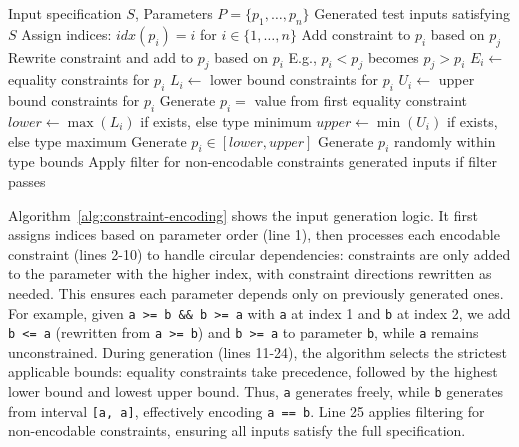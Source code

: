 \begin{algorithm}[t]
\caption{Constraint-Aware Input Generation (\VariantImproved{})}
\label{alg:constraint-encoding}
\begin{algorithmic}[1]
\REQUIRE Input specification $S$, Parameters $P = \{p_1, \ldots, p_n\}$
\ENSURE Generated test inputs satisfying $S$
\STATE Assign indices: $idx(p_i) = i$ for $i \in \{1, \ldots, n\}$
        \STATE Add constraint to $p_i$ based on $p_j$
    \ENDIF
        \STATE Rewrite constraint and add to $p_j$ based on $p_i$
        \STATE E.g., $p_i < p_j$ becomes $p_j > p_i$
    \ENDIF
\ENDFOR
{}
    \STATE $E_i \gets$ equality constraints for $p_i$
    \STATE $L_i \gets$ lower bound constraints for $p_i$  
    \STATE $U_i \gets$ upper bound constraints for $p_i$
        \STATE Generate $p_i = $ value from first equality constraint
        \STATE $lower \gets \max(L_i)$ if exists, else type minimum
        \STATE $upper \gets \min(U_i)$ if exists, else type maximum
        \STATE Generate $p_i \in [lower, upper]$
    \ELSE
        \STATE Generate $p_i$ randomly within type bounds
    \ENDIF
\ENDFOR
\STATE Apply filter for non-encodable constraints
\STATE \RETURN generated inputs if filter passes
\end{algorithmic}
\end{algorithm}

Algorithm~\ref{alg:constraint-encoding} shows
the input generation logic.
It first assigns indices based on parameter order (line 1),
then processes each encodable constraint (lines 2-10) to handle circular dependencies:
constraints are only added to the parameter with the higher index,
with constraint directions rewritten as needed.
This ensures each parameter depends only on previously generated ones.
For example, given \texttt{a >= b \&\& b >= a} with \texttt{a} at index 1 and \texttt{b} at index 2,
we add \texttt{b <= a} (rewritten from \texttt{a >= b})
and \texttt{b >= a} to parameter \texttt{b}, while \texttt{a} remains unconstrained.
During generation (lines 11-24), the algorithm selects the strictest applicable bounds:
equality constraints take precedence, followed by the highest lower bound and lowest upper bound.
Thus, \texttt{a} generates freely,
while \texttt{b} generates from interval \texttt{[a, a]}, effectively encoding \texttt{a == b}.
Line 25 applies filtering for non-encodable constraints,
ensuring all inputs satisfy the full specification.

